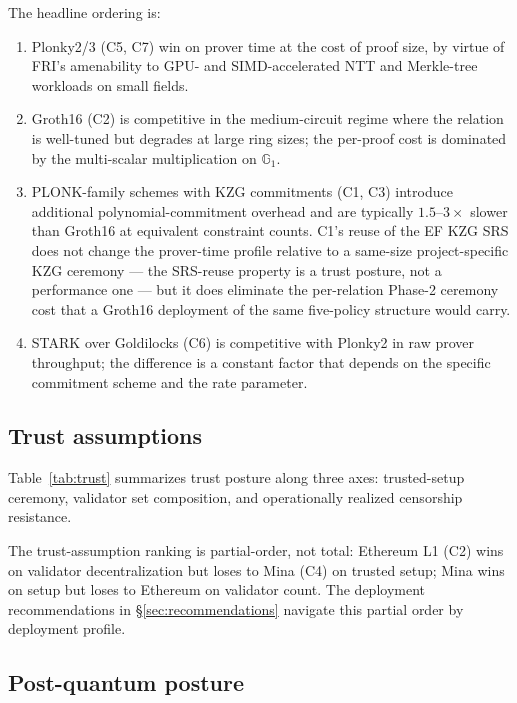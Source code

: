 The headline ordering is:
\begin{enumerate}
  \item Plonky2/3 (C5, C7) win on prover time at the cost of proof
    size, by virtue of FRI's amenability to GPU- and SIMD-accelerated
    NTT and Merkle-tree workloads on small fields.
  \item Groth16 (C2) is competitive in the medium-circuit regime
    where the relation is well-tuned but degrades at large ring
    sizes; the per-proof cost is dominated by the multi-scalar
    multiplication on $\mathbb{G}_1$.
  \item PLONK-family schemes with KZG commitments (C1, C3) introduce
    additional polynomial-commitment overhead and are typically
    $1.5$--$3\times$ slower than Groth16 at equivalent constraint
    counts. C1's reuse of the EF KZG SRS does not change the
    prover-time profile relative to a same-size project-specific
    KZG ceremony --- the SRS-reuse property is a trust posture, not
    a performance one --- but it does eliminate the per-relation
    Phase-2 ceremony cost that a Groth16 deployment of the same
    five-policy structure would carry.
  \item STARK over Goldilocks (C6) is competitive with Plonky2 in raw
    prover throughput; the difference is a constant factor that
    depends on the specific commitment scheme and the rate parameter.
\end{enumerate}



\subsection{Trust assumptions}
\label{sec:analysis-trust}

Table~\ref{tab:trust} summarizes trust posture along three axes:
trusted-setup ceremony, validator set composition, and operationally
realized censorship resistance.



The trust-assumption ranking is partial-order, not total: Ethereum L1
(C2) wins on validator decentralization but loses to Mina (C4) on
trusted setup; Mina wins on setup but loses to Ethereum on validator
count. The deployment recommendations in
\S\ref{sec:recommendations} navigate this partial order by deployment
profile.

\subsection{Post-quantum posture}
\label{sec:analysis-pq}

